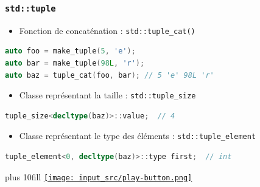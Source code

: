 \documentclass[C++.tex]{subfiles}
\begin{document}
\begin{frame}[fragile]
	\frametitle{\lstinline|std::tuple|}
	\begin{itemize}
		\item Fonction de concaténation : \lstinline|std::tuple_cat()|
	\end{itemize}

	\begin{lstlisting}[language=C++]
auto foo = make_tuple(5, 'e');
auto bar = make_tuple(98L, 'r');
auto baz = tuple_cat(foo, bar); // 5 'e' 98L 'r'\end{lstlisting}

	\begin{itemize}
		\item Classe représentant la taille : \lstinline|std::tuple_size|
	\end{itemize}

	\begin{lstlisting}[language=C++]
tuple_size<decltype(baz)>::value;  // 4\end{lstlisting}

	\begin{itemize}
		\item Classe représentant le type des éléments : \lstinline|std::tuple_element|
	\end{itemize}

	\begin{lstlisting}[language=C++]
tuple_element<0, decltype(baz)>::type first;  // int\end{lstlisting}

	\vskip 10mm plus 10fill
	\hfill
	\href{https://godbolt.org/#g:!((g:!((g:!((h:codeEditor,i:(filename:'1',fontScale:14,fontUsePx:'0',j:1,lang:c%2B%2B,selection:(endColumn:1,endLineNumber:23,positionColumn:1,positionLineNumber:23,selectionStartColumn:1,selectionStartLineNumber:23,startColumn:1,startLineNumber:23),source:'%23include+%3Ciostream%3E%0A%23include+%3Cstring%3E%0A%23include+%3Ctuple%3E%0A%0Aint+main()%0A%7B%0A++std::tuple%3Cint,+std::string,+double%3E+foo+%3D+std::make_tuple(42,+%22FOO%22,+25.2)%3B%0A%0A++int+a%3B%0A++double+b%3B%0A%0A++std::tie(a,+std::ignore,+b)+%3D+foo%3B%0A++std::cout+%3C%3C+a+%3C%3C+!'+!'+%3C%3C+b+%3C%3C+!'%5Cn!'%3B%0A%0A++std::string+c+%3D+std::get%3C1%3E(foo)%3B%0A++std::cout+%3C%3C+c+%3C%3C+!'%5Cn!'%3B%0A%0A++auto+bar+%3D+std::make_tuple(12,+5UL)%3B%0A++auto+baz+%3D+std::tuple_cat(foo,+bar)%3B%0A%0A++std::cout+%3C%3C+std::tuple_size%3Cdecltype(baz)%3E::value+%3C%3C+!'%5Cn!'%3B%0A%7D%0A'),l:'5',n:'0',o:'C%2B%2B+source+%231',t:'0')),k:50,l:'4',n:'0',o:'',s:0,t:'0'),(g:!((h:executor,i:(argsPanelShown:'1',compilationPanelShown:'0',compiler:g112,compilerOutShown:'0',execArgs:'',execStdin:'',fontScale:14,fontUsePx:'0',j:1,lang:c%2B%2B,libs:!((name:boost,ver:'175')),options:'-std%3Dc%2B%2B11',source:1,stdinPanelShown:'1',tree:'1',wrap:'0'),l:'5',n:'0',o:'Executor+x86-64+gcc+11.2+(C%2B%2B,+Editor+%231)',t:'0')),header:(),k:50,l:'4',n:'0',o:'',s:0,t:'0')),l:'2',n:'0',o:'',t:'0')),version:4}{\texttt{[image: input\_src/play-button.png]}}
\end{frame}
\end{document}
